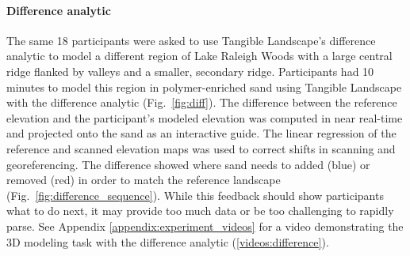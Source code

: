\documentclass[prodmode,acmtochi]{acmsmall} %
\begin{document}

\paragraph{Difference analytic}
The same 18 participants were asked to use 
Tangible Landscape's difference analytic to model 
a different region of Lake Raleigh Woods
with a large central ridge 
flanked by valleys 
and a smaller, secondary ridge.
Participants had 10 minutes to model this region
in polymer-enriched sand using Tangible Landscape 
with the difference analytic (Fig.~\ref{fig:diff}). 
The difference between the reference elevation 
and the participant's modeled elevation %
was computed in near real-time and projected onto the sand 
as an interactive guide.
The linear regression of the reference and scanned elevation maps was used
to correct shifts in scanning and georeferencing. 
The difference showed where sand needs to added (blue) or removed (red) 
in order to match the reference landscape (Fig.~\ref{fig:difference_sequence}). 
While this feedback should show participants what to do next, 
it may provide too much data or be too challenging to rapidly parse.
%
See Appendix \ref{appendix:experiment_videos}
for a video demonstrating the 3D modeling task with the difference analytic (\ref{videos:difference}).

\end{document}
